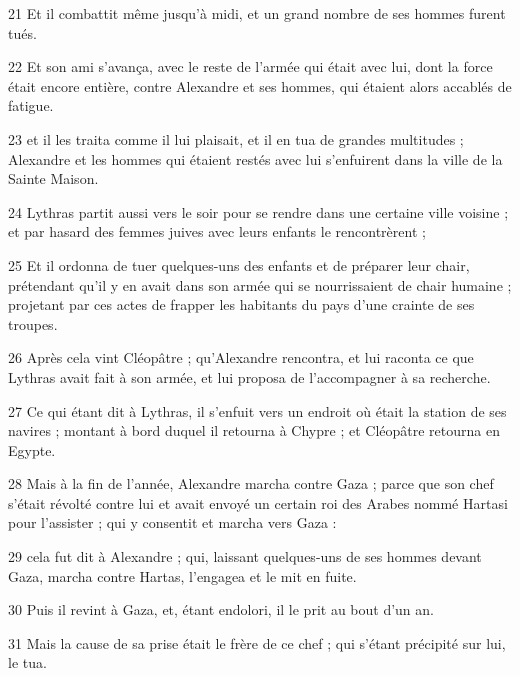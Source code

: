 \par 21 Et il combattit même jusqu'à midi, et un grand nombre de ses hommes furent tués.

\par 22 Et son ami s'avança, avec le reste de l'armée qui était avec lui, dont la force était encore entière, contre Alexandre et ses hommes, qui étaient alors accablés de fatigue.

\par 23 et il les traita comme il lui plaisait, et il en tua de grandes multitudes ; Alexandre et les hommes qui étaient restés avec lui s'enfuirent dans la ville de la Sainte Maison.

\par 24 Lythras partit aussi vers le soir pour se rendre dans une certaine ville voisine ; et par hasard des femmes juives avec leurs enfants le rencontrèrent ;

\par 25 Et il ordonna de tuer quelques-uns des enfants et de préparer leur chair, prétendant qu'il y en avait dans son armée qui se nourrissaient de chair humaine ; projetant par ces actes de frapper les habitants du pays d'une crainte de ses troupes.

\par 26 Après cela vint Cléopâtre ; qu'Alexandre rencontra, et lui raconta ce que Lythras avait fait à son armée, et lui proposa de l'accompagner à sa recherche.

\par 27 Ce qui étant dit à Lythras, il s'enfuit vers un endroit où était la station de ses navires ; montant à bord duquel il retourna à Chypre ; et Cléopâtre retourna en Egypte.

\par 28 Mais à la fin de l'année, Alexandre marcha contre Gaza ; parce que son chef s'était révolté contre lui et avait envoyé un certain roi des Arabes nommé Hartasi pour l'assister ; qui y consentit et marcha vers Gaza :

\par 29 cela fut dit à Alexandre ; qui, laissant quelques-uns de ses hommes devant Gaza, marcha contre Hartas, l'engagea et le mit en fuite.

\par 30 Puis il revint à Gaza, et, étant endolori, il le prit au bout d'un an.

\par 31 Mais la cause de sa prise était le frère de ce chef ; qui s'étant précipité sur lui, le tua.

